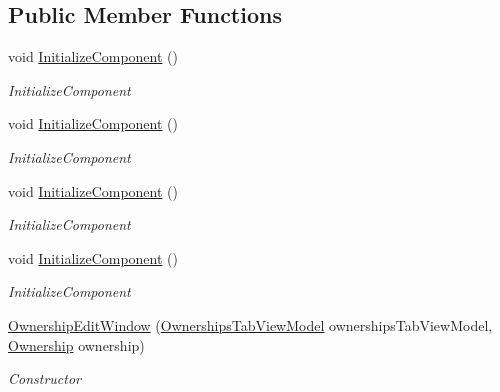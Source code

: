 \subsection*{Public Member Functions}
\begin{DoxyCompactItemize}
\item 
void \hyperlink{class_baudi_1_1_client_1_1_view_1_1_edit_windows_1_1_ownership_edit_window_acbe2a90f371a7f9e993212a0e19932ac}{Initialize\+Component} ()
\begin{DoxyCompactList}\small\item\em Initialize\+Component \end{DoxyCompactList}\item 
void \hyperlink{class_baudi_1_1_client_1_1_view_1_1_edit_windows_1_1_ownership_edit_window_acbe2a90f371a7f9e993212a0e19932ac}{Initialize\+Component} ()
\begin{DoxyCompactList}\small\item\em Initialize\+Component \end{DoxyCompactList}\item 
void \hyperlink{class_baudi_1_1_client_1_1_view_1_1_edit_windows_1_1_ownership_edit_window_acbe2a90f371a7f9e993212a0e19932ac}{Initialize\+Component} ()
\begin{DoxyCompactList}\small\item\em Initialize\+Component \end{DoxyCompactList}\item 
void \hyperlink{class_baudi_1_1_client_1_1_view_1_1_edit_windows_1_1_ownership_edit_window_acbe2a90f371a7f9e993212a0e19932ac}{Initialize\+Component} ()
\begin{DoxyCompactList}\small\item\em Initialize\+Component \end{DoxyCompactList}\item 
\hyperlink{class_baudi_1_1_client_1_1_view_1_1_edit_windows_1_1_ownership_edit_window_a3a07d3ba8f79562e8d2f6f73fcfdcb9f}{Ownership\+Edit\+Window} (\hyperlink{class_baudi_1_1_client_1_1_view_models_1_1_tabs_view_models_1_1_ownerships_tab_view_model}{Ownerships\+Tab\+View\+Model} ownerships\+Tab\+View\+Model, \hyperlink{class_baudi_1_1_d_a_l_1_1_models_1_1_ownership}{Ownership} ownership)
\begin{DoxyCompactList}\small\item\em Constructor \end{DoxyCompactList}\end{DoxyCompactItemize}


